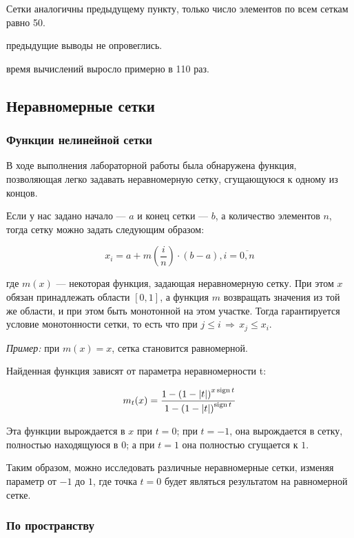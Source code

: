 Сетки аналогичны предыдущему пункту, только число элементов по всем сеткам равно 50.


\conclusion предыдущие выводы не опровеглись.

\conclusion время вычислений выросло примерно в 110 раз.

\subsection{Неравномерные сетки}

\subsubsection{Функции нелинейной сетки}

В ходе выполнения лабораторной работы была обнаружена функция, позволяющая легко задавать неравномерную сетку, сгущающуюся к одному из концов.

Если у нас задано начало --- $a$ и конец сетки --- $b$, а количество элементов $n$, тогда сетку можно задать следующим образом:

$$ x_i = a + m\left(\frac{i}{n}\right) \cdot (b-a), i=\overline{0, n} $$

где $m(x)$ --- некоторая функция, задающая неравномерную сетку. При этом $x$ обязан принадлежать области $[0, 1]$, а функция $m$ возвращать значения из той же области, и при этом быть монотонной на этом участке. Тогда гарантируется условие монотонности сетки, то есть что при $j \leqslant i\, \Rightarrow\, x_j \leqslant x_i$. 

\textit{Пример:} при $m(x) = x$, сетка становится равномерной.

Найденная функция зависят от параметра неравномерности t:

$$ m_t(x) = \frac{1-\left(1-|t|\right)^{x\operatorname{sign} t}}{1-\left(1-|t|\right)^{\operatorname{sign} t}} $$

Эта функции вырождается в $x$ при $t=0$; при $t=-1$, она вырождается в сетку, полностью находящуюся в $0$; а при $t=1$ она полностью сгущается к $1$. 

Таким образом, можно исследовать различные неравномерные сетки, изменяя параметр от $-1$ до $1$, где точка $t=0$ будет являться результатом на равномерной сетке.

\subsubsection{По пространству}

